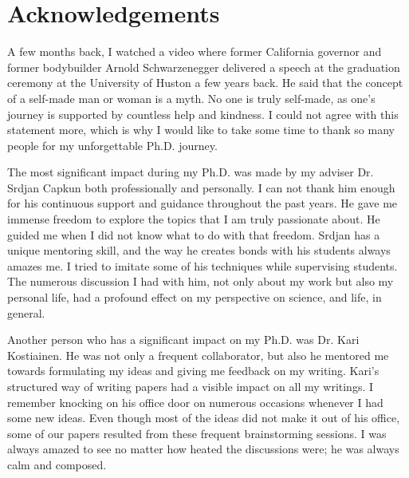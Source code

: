 
\bigskip

\begingroup
\let\clearpage\relax
\let\cleardoublepage\relax
\let\cleardoublepage\relax
\chapter*{Acknowledgements}

\def\thanks#1{%
\begingroup
\leftskip1em
\noindent #1
\par
\endgroup
}

A few months back, I watched a video where former California governor and former bodybuilder Arnold Schwarzenegger delivered a speech at the graduation ceremony at the University of Huston a few years back. He said that the concept of a self-made man or woman is a myth. No one is truly self-made, as one's journey is supported by countless help and kindness. I could not agree with this statement more, which is why I would like to take some time to thank so many people for my unforgettable Ph.D. journey.


The most significant impact during my Ph.D. was made by my adviser Dr. Srdjan Capkun both professionally and personally. I can not thank him enough for his continuous support and guidance throughout the past years. He gave me immense freedom to explore the topics that I am truly passionate about. He guided me when I did not know what to do with that freedom. Srdjan has a unique mentoring skill, and the way he creates bonds with his students always amazes me. I tried to imitate some of his techniques while supervising students. The numerous discussion I had with him, not only about my work but also my personal life, had a profound effect on my perspective on science, and life, in general.


Another person who has a significant impact on my Ph.D. was Dr. Kari Kostiainen. He was not only a frequent collaborator, but also he mentored me towards formulating my ideas and giving me feedback on my writing.  Kari's structured way of writing papers had a visible impact on all my writings. I remember knocking on his office door on numerous occasions whenever I had some new ideas. Even though most of the ideas did not make it out of his office, some of our papers resulted from these frequent brainstorming sessions. I was always amazed to see no matter how heated the discussions were; he was always calm and composed.


